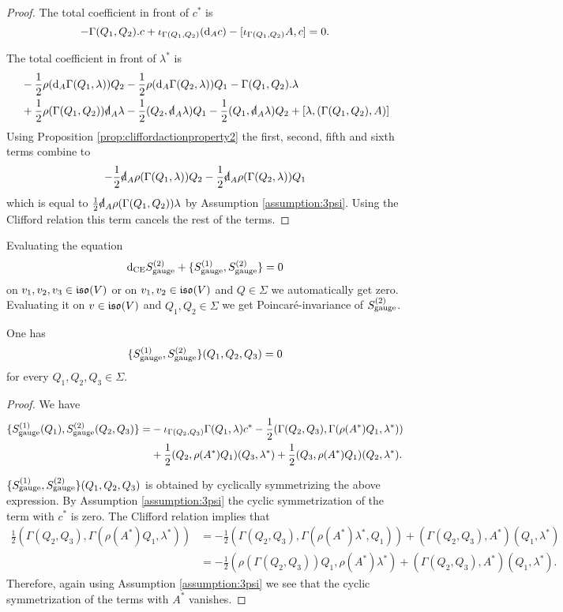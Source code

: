 \documentclass[10pt, oneside]{article}
\begin{document}
\begin{proof}
The total coefficient in front of $c^*$ is
\[-\Gamma(Q_1, Q_2).c + \iota_{\Gamma(Q_1, Q_2)}({\rm d}_A c) - [\iota_{\Gamma(Q_1, Q_2)} A, c] = 0.\]

The total coefficient in front of $\lambda^*$ is
\begin{align*}
&-\frac{1}{2}\rho(\d_A \Gamma(Q_1, \lambda))Q_2 -\frac{1}{2}\rho(\d_A \Gamma(Q_2, \lambda))Q_1 - \Gamma(Q_1, Q_2).\lambda \\
&+ \frac{1}{2}\rho(\Gamma(Q_1, Q_2))\sd{\d}_A\lambda - \frac{1}{2}(Q_2, \sd{\d}_A\lambda) Q_1 -\frac{1}{2}(Q_1, \sd{\d}_A\lambda) Q_2 + [\lambda, (\Gamma(Q_1, Q_2), A)]
\end{align*}
Using Proposition \ref{prop:cliffordactionproperty2} the first, second, fifth and sixth terms combine to
\[-\frac{1}{2} \sd{\d}_A\rho(\Gamma(Q_1, \lambda))Q_2 - \frac{1}{2} \sd{\d}_A\rho(\Gamma(Q_2, \lambda)) Q_1\]
which is equal to $\frac{1}{2} \sd{\d}_A \rho(\Gamma(Q_1, Q_2))\lambda$ by Assumption \ref{assumption:3psi}. Using the Clifford relation this term cancels the rest of the terms.
\end{proof}

Evaluating the equation
\[{\rm d}_{\mathrm{CE}} S_{\mathrm{gauge}}^{(2)} + \{S_{\mathrm{gauge}}^{(1)}, S_{\mathrm{gauge}}^{(2)}\} = 0\]
on $v_1, v_2, v_3\in\mathfrak{iso}(V)$ or on $v_1, v_2\in\mathfrak{iso}(V)$ and $Q\in\Sigma$ we automatically get zero. Evaluating it on $v\in\mathfrak{iso}(V)$ and $Q_1, Q_2\in\Sigma$ we get Poincar\'{e}-invariance of $S_{\mathrm{gauge}}^{(2)}$.

\begin{lemma}
One has
\[\{S_{\mathrm{gauge}}^{(1)}, S_{\mathrm{gauge}}^{(2)}\}(Q_1, Q_2, Q_3) = 0\]
for every $Q_1, Q_2, Q_3\in\Sigma$.
\label{lm:gaugemultiplet3}
\end{lemma}
\begin{proof}
We have
\begin{align*}
\{S_{\mathrm{gauge}}^{(1)}(Q_1), S_{\mathrm{gauge}}^{(2)}(Q_2, Q_3)\} = &-\iota_{\Gamma(Q_2, Q_3)}\Gamma(Q_1, \lambda) c^* - \frac{1}{2} (\Gamma(Q_2, Q_3), \Gamma(\rho(A^*) Q_1, \lambda^*)) \\
&+ \frac{1}{2}(Q_2, \rho(A^*)Q_1)(Q_3, \lambda^*) + \frac{1}{2}(Q_3, \rho(A^*) Q_1)(Q_2, \lambda^*).
\end{align*}

$\{S_{\mathrm{gauge}}^{(1)}, S_{\mathrm{gauge}}^{(2)}\}(Q_1, Q_2, Q_3)$ is obtained by cyclically symmetrizing the above expression. By Assumption \ref{assumption:3psi} the cyclic symmetrization of the term with $c^*$ is zero. The Clifford relation implies that
\begin{align*}
\frac{1}{2} (\Gamma(Q_2, Q_3), \Gamma(\rho(A^*) Q_1, \lambda^*)) &= -\frac{1}{2}(\Gamma(Q_2, Q_3), \Gamma(\rho(A^*)\lambda^*, Q_1)) + (\Gamma(Q_2, Q_3), A^*) (Q_1, \lambda^*) \\
&= -\frac{1}{2}(\rho(\Gamma(Q_2, Q_3)) Q_1, \rho(A^*)\lambda^*) + (\Gamma(Q_2, Q_3), A^*) (Q_1, \lambda^*).
\end{align*}
Therefore, again using Assumption \ref{assumption:3psi} we see that the cyclic symmetrization of the terms with $A^*$ vanishes.
\end{proof}
\end{document}
